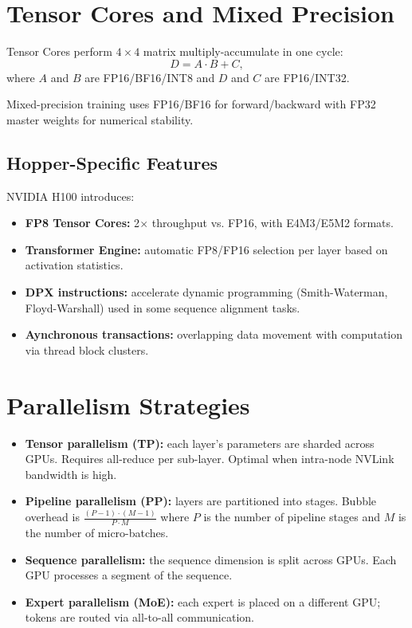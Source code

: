 \documentclass[11pt,a4paper]{book}
\theoremstyle{definition}
\begin{document}
\section{Tensor Cores and Mixed Precision}

Tensor Cores perform $4 \times 4$ matrix multiply-accumulate in one cycle:
\begin{equation}
	D = A \cdot B + C,
\end{equation}
where $A$ and $B$ are FP16/BF16/INT8 and $D$ and $C$ are FP16/INT32.

Mixed-precision training uses FP16/BF16 for forward/backward with FP32 master weights for numerical stability.

\subsection{Hopper-Specific Features}

NVIDIA H100 introduces:
\begin{itemize}
	\item \textbf{FP8 Tensor Cores:} 2$\times$ throughput vs. FP16, with E4M3/E5M2 formats.
	\item \textbf{Transformer Engine:} automatic FP8/FP16 selection per layer based on activation statistics.
	\item \textbf{DPX instructions:} accelerate dynamic programming (Smith-Waterman, Floyd-Warshall) used in some sequence alignment tasks.
	\item \textbf{Aynchronous transactions:} overlapping data movement with computation via thread block clusters.
\end{itemize}

\section{Parallelism Strategies}

\begin{itemize}
	\item \textbf{Tensor parallelism (TP):} each layer's parameters are sharded across GPUs. Requires all-reduce per sub-layer. Optimal when intra-node NVLink bandwidth is high.
	\item \textbf{Pipeline parallelism (PP):} layers are partitioned into stages. Bubble overhead is $\frac{(P-1) \cdot (M-1)}{P \cdot M}$ where $P$ is the number of pipeline stages and $M$ is the number of micro-batches.
	\item \textbf{Sequence parallelism:} the sequence dimension is split across GPUs. Each GPU processes a segment of the sequence.
	\item \textbf{Expert parallelism (MoE):} each expert is placed on a different GPU; tokens are routed via all-to-all communication.
\end{itemize}
\end{document}

